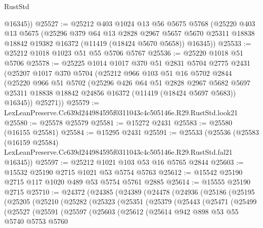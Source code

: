 \begin{lexlean}{RustStd}
\begin{coremodule}
        @16345))
@25527 := @25212
    @403
    @1024
    @13
    @56
    @5675
    @5768
    (@25220
      @403
      @13
      @5675
      (@25296
        @379
        @64
        @13
        @2828
        @2967
        @5657
        @5670
        @25311
        @18838
        @18842
        @19382
        @16372
        (@11419 (@18424 @5670 @5658))
        @16345))
@25533 := @25212 @1018 @1023 @51 @55 @5706 @5767
@25536 := @25220 @1018 @51 @5706
@25578 := @25225
    @1014
    @1017
    @370
    @51
    @2831
    @5704
    @2775
    @2431
    (@25207
      @1017
      @370
      @5704
      (@25212
        @966
        @103
        @51
        @16
        @5702
        @2844
        (@25220
          @966
          @51
          @5702
          (@25296
            @426
            @64
            @51
            @2828
            @2967
            @5682
            @5697
            @25311
            @18838
            @18842
            @24856
            @16372
            (@11419 (@18424 @5697 @5683))
            @16345))
        @25271))
@25579 := LexLeanPreserve.Cc639d244984595f0311043c4c505146e.R29.RustStd.look21
@25580 := @25578 @25579
@25581 := @15272 @2431
@25583 := @25580 (@16155 @25581)
@25584 := @15295 @2431
@25591 := @25533
    (@25536
      (@25583
        (@16159 @25584)
        LexLeanPreserve.Cc639d244984595f0311043c4c505146e.R29.RustStd.fal21
        @16345))
@25597 := @25212 @1021 @103 @53 @16 @5765 @2844
@25603 := @15532 @25190 @2715 @1021 @53 @5754 @5763
@25612 := @15542 @25190 @2715 @117 @1020 @489 @53 @5754 @5761 @2885
@25614 := @15555 @25190 @2715
@25710 := @24372
    (@24385
      (@24389
        (@24478
          (@24936
            (@25186
              (@25195
                (@25205
                  (@25210
                    (@25282
                      (@25323
                        (@25351
                          (@25379
                            (@25443
                              (@25471
                                (@25499
                                  (@25527
                                    (@25591
                                      (@25597
                                        (@25603
                                          (@25612
                                            (@25614
                                              @942
                                              @898
                                              @53
                                              @55
                                              @5740
                                              @5753
                                              @5760

\end{coremodule}
\end{lexlean}
